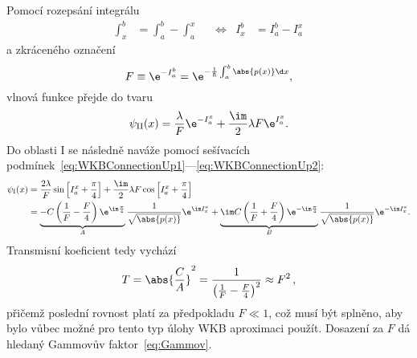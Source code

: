 \begin{solution}
\begin{enumerate}
		Pomocí rozepsání integrálu
		\begin{align}
			\int_{x}^{b}&=\int_{a}^{b}-\int_{a}^{x} && \Longleftrightarrow & I_{x}^{b}&=I_{a}^{b}-I_{a}^{x}
		\end{align}
		a zkráceného označení
		\begin{equation}
			F\equiv\e^{-I_{a}^{b}}=\e^{-\frac{1}{\hbar}\int_{a}^{b}\abs{p(x)}\d x},
		\end{equation}
		vlnová funkce přejde do tvaru
		\begin{equation}
			\psi_{\mathrm{II}}(x)=\frac{\lambda}{F}\e^{-I_{a}^{x}}+\frac{\im}{2}\lambda F\e^{I_{a}^{x}}.
		\end{equation}
		Do oblasti I se následně naváže pomocí sešívacích podmínek~\eqref{eq:WKBConnectionUp1}---\eqref{eq:WKBConnectionUp2}:
		\begin{align}
			\psi_{\mathrm{I}}(x)
				&=\frac{2\lambda}{F}\sin\left[I_{a}^{x}+\frac{\pi}{4}\right]+\frac{\im}{2}\lambda F\cos\left[I_{a}^{x}+\frac{\pi}{4}\right]\nonumber\\										
				&=\underbrace{-C\left(\frac{1}{F}-\frac{F}{4}\right)\e^{\im\frac{\pi}{4}}}_{A}\frac{1}{\sqrt{\abs{p(x)}}}\e^{\im I_{x}^{a}}
					+\underbrace{\im C\left(\frac{1}{F}+\frac{F}{4}\right)\e^{-\im\frac{\pi}{4}}}_{B}\frac{1}{\sqrt{\abs{p(x)}}}\e^{-\im I_{x}^{a}}.						
		\end{align}
		Transmisní koeficient tedy vychází
		\begin{equation}
			T=\abs{\frac{C}{A}}^{2}=\frac{1}{\left(\frac{1}{F}-\frac{F}{4}\right)^{2}}\approx F^{2}\,,
		\end{equation}
		přičemž poslední rovnost platí za předpokladu $F\ll1$, což musí být splněno, aby bylo vůbec možné pro tento typ úlohy WKB aproximaci použít.
		Dosazení za $F$ dá hledaný Gammovův faktor~\eqref{eq:Gammov}.
		

\end{enumerate}
\end{solution}
